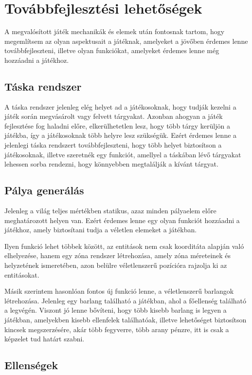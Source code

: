 \chapter{Továbbfejlesztési lehetőségek}

\indent \indent A megvalósított játék mechanikák és elemek után fontosnak tartom, hogy megemlítsem az olyan aspektusait a játéknak, amelyeket a jövőben érdemes lenne továbbfejleszteni, illetve olyan funkciókat, amelyeket érdemes lenne még hozzáadni a játékhoz.


\section{Táska rendszer}
\indent \indent A táska rendszer jelenleg elég helyet ad a játékosoknak, hogy tudják kezelni a játék során megvásárolt vagy felvett tárgyakat. Azonban ahogyan a játék fejlesztése fog haladni előre, elkerülhetetlen lesz, hogy több tárgy kerüljön a játékba, így a játékosoknak több helyre lesz szükségük. Ezért érdemes lenne a jelenlegi táska rendszert továbbfejleszteni, hogy több helyet biztosítson a játékosoknak, illetve szeretnék egy funkciót, amellyel a táskában lévő tárgyakat lehessen sorba rendezni, hogy könnyebben megtalálják a kívánt tárgyat.

\section{Pálya generálás}
\indent \indent Jelenleg a világ teljes mértékben statikus, azaz minden pályaelem előre meghatározott helyen van. Ezért érdemes lenne egy olyan funkciót hozzáadni a játékhoz, amely biztosítani tudja a véletlen elemeket a játékban.

Ilyen funkció lehet többek között, az entitások nem csak koorditáta alapján való elhelyezése, hanem egy zóna rendszer létrehozása, amely zóna méreteinek és helyzetének ismeretében, azon belülre véletlenszerű pozícióra rajzolja ki az entitásokat.

Másik szerintem hasonlóan fontos új funkció lenne, a véletlenszerű barlangok létrehozása. Jelenleg egy barlang található a játékban, ahol a főellenség található a legvégén. Viszont jó lenne bővíteni, hogy több kisebb barlang is legyen a játékban, amelyekben kisebb ellenfelek találhatóak, illetve lehetőséget biztosítson kincsek megszerzésére, akár több fegyverre, több arany pénzre, itt is csak a képzelet tud határt szabni.

\section{Ellenségek}

